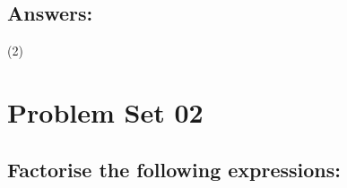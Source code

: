 	\subsection*{Answers:}
		\begin{tasks}[label = \arabic*.,label-width = 1.5em](2) %
			\task 
		\end{tasks}

\newpage
\section{Problem Set 02}
	\subsection*{Factorise the following expressions:}
